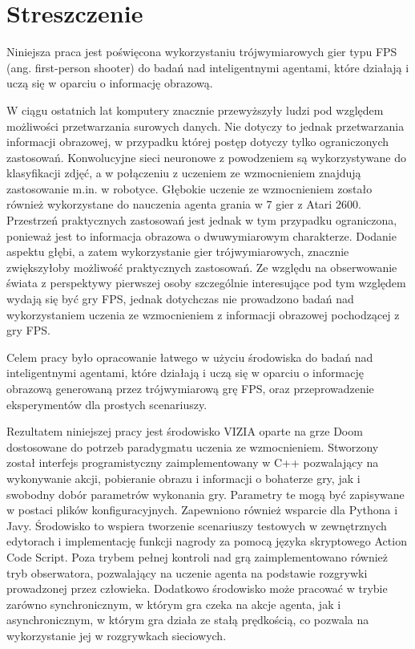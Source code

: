 \chapter*{Streszczenie}

Niniejsza praca jest poświęcona wykorzystaniu trójwymiarowych gier typu FPS (ang. first-person shooter) do badań nad inteligentnymi agentami, które działają i uczą się w oparciu o informację obrazową.

W ciągu ostatnich lat komputery znacznie przewyższyły ludzi pod względem możliwości przetwarzania surowych danych.
Nie dotyczy to jednak przetwarzania informacji obrazowej, w przypadku której postęp dotyczy tylko ograniczonych zastosowań.
Konwolucyjne sieci neuronowe z powodzeniem są wykorzystywane do klasyfikacji zdjęć, a w połączeniu z uczeniem ze wzmocnieniem znajdują zastosowanie m.in. w robotyce.
Głębokie uczenie ze wzmocnieniem zostało również wykorzystane do nauczenia agenta grania w 7 gier z Atari 2600.
Przestrzeń praktycznych zastosowań jest jednak w tym przypadku ograniczona, ponieważ jest to informacja obrazowa o dwuwymiarowym charakterze.
Dodanie aspektu głębi, a zatem wykorzystanie gier trójwymiarowych, znacznie zwiększyłoby możliwość praktycznych zastosowań.
Ze względu na obserwowanie świata z perspektywy pierwszej osoby szczególnie interesujące pod tym względem wydają się być gry FPS, jednak dotychczas nie prowadzono badań nad wykorzystaniem uczenia ze wzmocnieniem z informacji obrazowej pochodzącej z gry FPS.

Celem pracy było opracowanie łatwego w użyciu środowiska do badań nad inteligentnymi agentami, które działają i uczą się w oparciu o informację obrazową generowaną przez trójwymiarową grę FPS, oraz przeprowadzenie eksperymentów dla prostych scenariuszy.

Rezultatem niniejszej pracy jest środowisko VIZIA oparte na grze Doom dostosowane do potrzeb paradygmatu uczenia ze wzmocnieniem.
Stworzony został interfejs programistyczny zaimplementowany w C++ pozwalający na wykonywanie akcji, pobieranie obrazu i informacji o bohaterze gry, jak i swobodny dobór parametrów wykonania gry.
Parametry te mogą być zapisywane w postaci plików konfiguracyjnych.
Zapewniono również wsparcie dla Pythona i Javy.
Środowisko to wspiera tworzenie scenariuszy testowych w zewnętrznych edytorach i implementację funkcji nagrody za pomocą języka skryptowego Action Code Script.
Poza trybem pełnej kontroli nad grą zaimplementowano również tryb obserwatora, pozwalający na uczenie agenta na podstawie rozgrywki prowadzonej przez człowieka.
Dodatkowo środowisko może pracować w trybie zarówno synchronicznym, w którym gra czeka na akcje agenta, jak i asynchronicznym, w którym gra działa ze stałą prędkością, co pozwala na wykorzystanie jej w rozgrywkach sieciowych.

